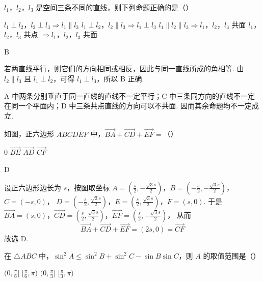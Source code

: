 \begin{problem}
\(l_1\)，\(l_2\)，\(l_3\) 是空间三条不同的直线，则下列命题正确的是（\quad）

\choices
    {\(l_1 \perp l_2\)，\(l_2 \perp l_3 \Rightarrow l_1 \parallel l_3\)}
    {\(l_1 \perp l_2\)，\(l_2 \parallel l_3 \Rightarrow l_1 \perp l_3\)}
    {\(l_1 \parallel l_2 \parallel l_3 \Rightarrow l_1\)，\(l_2\)，\(l_3\) 共面}
    {\(l_1\)，\(l_2\)，\(l_3\) 共点 \(\Rightarrow l_1\)，\(l_2\)，\(l_3\) 共面}
\end{problem}

\begin{answer}
B
\end{answer}

\begin{solution}
若两直线平行，则它们的方向相同或相反，因此与同一直线所成的角相等. 由 \(l_2\parallel l_3\) 且 \(l_1\perp l_2\)，可得 \(l_1\perp l_3\)，所以 B 正确.

A 中两条分别垂直于同一直线的直线不一定平行；C 中三条同方向的直线不一定在同一个平面内；D 中三条共点直线的方向可以不共面. 因而其余命题均不一定成立.
\end{solution}

\begin{problem}
如图，正六边形 \(ABCDEF\) 中，\(\overrightarrow{BA} + \overrightarrow{CD} + \overrightarrow{EF} =\)（\quad）


\choices
    {\(0\)}
    {\(\overrightarrow{BE}\)}
    {\(\overrightarrow{AD}\)}
    {\(\overrightarrow{CF}\)}
\end{problem}

\begin{answer}
D
\end{answer}

\begin{solution}
设正六边形边长为 \(s\)，按图取坐标
\(A=\left(\frac{s}{2},-\frac{\sqrt3s}{2}\right)\)，\(B=\left(-\frac{s}{2},-\frac{\sqrt3s}{2}\right)\)，\(C=(-s,0)\)，
\(D=\left(-\frac{s}{2},\frac{\sqrt3s}{2}\right)\)，\(E=\left(\frac{s}{2},\frac{\sqrt3s}{2}\right)\)，\(F=(s,0)\).
于是
\(\overrightarrow{BA}=(s,0)\)，\(\overrightarrow{CD}=\left(\frac{s}{2},\frac{\sqrt3s}{2}\right)\)，\(\overrightarrow{EF}=\left(\frac{s}{2},-\frac{\sqrt3s}{2}\right)\)，
从而
\[
\overrightarrow{BA}+\overrightarrow{CD}+\overrightarrow{EF}=(2s,0)=\overrightarrow{CF}
\]
故选 D.
\end{solution}

\begin{problem}
在 \(\triangle ABC\) 中，\(\sin^2 A \leqslant \sin^2 B + \sin^2 C - \sin B \sin C\)，则 \(A\) 的取值范围是（\quad）

\choices
    {\((0, \frac{\pi}{6}]\)}
    {\([\frac{\pi}{6}, \pi)\)}
    {\((0, \frac{\pi}{3}]\)}
    {\([\frac{\pi}{3}, \pi)\)}
\end{problem}

